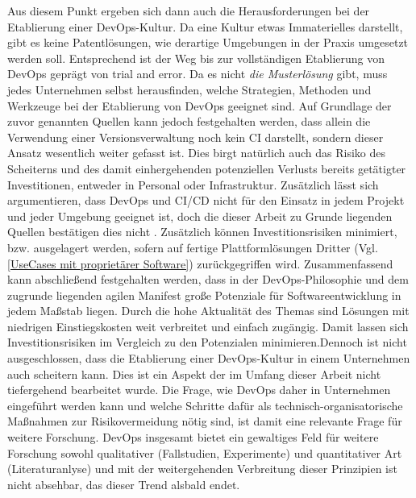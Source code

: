 Aus diesem Punkt ergeben sich dann auch die Herausforderungen bei der Etablierung einer \acrshort{DevOps}-Kultur. Da eine Kultur etwas Immaterielles darstellt, gibt es keine Patentlösungen, wie derartige Umgebungen in der Praxis umgesetzt werden soll.
Entsprechend ist der Weg bis zur vollständigen Etablierung von \gls{DevOps} geprägt von \glqq{}trial and error\grqq{}. Da es nicht \textit{die Musterlösung} gibt, muss jedes Unternehmen selbst herausfinden, welche Strategien, Methoden und Werkzeuge bei der Etablierung von \gls{DevOps} geeignet sind. Auf Grundlage der zuvor genannten Quellen kann jedoch festgehalten werden, dass allein die Verwendung einer Versionsverwaltung noch kein \acrshort{CI} darstellt, sondern dieser Ansatz wesentlich weiter gefasst ist. Dies birgt natürlich auch das Risiko des Scheiterns und des damit einhergehenden potenziellen Verlusts bereits getätigter Investitionen, entweder in Personal oder Infrastruktur. Zusätzlich lässt sich argumentieren, dass \gls{DevOps} und \acrshort{CI}/\acrshort{CD} nicht für den Einsatz in jedem Projekt und jeder Umgebung geeignet ist, doch die dieser Arbeit zu Grunde liegenden Quellen bestätigen dies nicht \cite[Abb. 2 und 3]{hilton_usage_2016}. Zusätzlich können Investitionsrisiken minimiert, bzw. ausgelagert werden, sofern auf fertige Plattformlösungen Dritter (Vgl. \ref{UseCases mit proprietärer Software}) zurückgegriffen wird.\newline
Zusammenfassend kann abschließend festgehalten werden, dass in der \gls{DevOps}-Philosophie und dem zugrunde liegenden agilen Manifest \cite{beck_manifest_2001} große Potenziale für Softwareentwicklung in jedem Maßstab liegen. Durch die hohe Aktualität des Themas sind Lösungen mit niedrigen Einstiegskosten weit verbreitet und einfach zugängig. Damit lassen sich Investitionsrisiken im Vergleich zu den Potenzialen minimieren.Dennoch ist nicht ausgeschlossen, dass die Etablierung einer \acrshort{DevOps}-Kultur in einem Unternehmen auch scheitern kann. Dies ist ein Aspekt der im Umfang dieser Arbeit nicht tiefergehend bearbeitet wurde.
Die Frage, wie \gls{DevOps} daher in Unternehmen eingeführt werden kann und welche Schritte dafür als technisch-organisatorische Maßnahmen zur Risikovermeidung nötig sind, ist damit eine relevante Frage für weitere Forschung. \gls{DevOps} insgesamt bietet ein gewaltiges Feld für weitere Forschung sowohl qualitativer (Fallstudien, Experimente) und quantitativer Art (Literaturanlyse) und mit der weitergehenden Verbreitung dieser Prinzipien ist nicht absehbar, das dieser Trend alsbald endet.